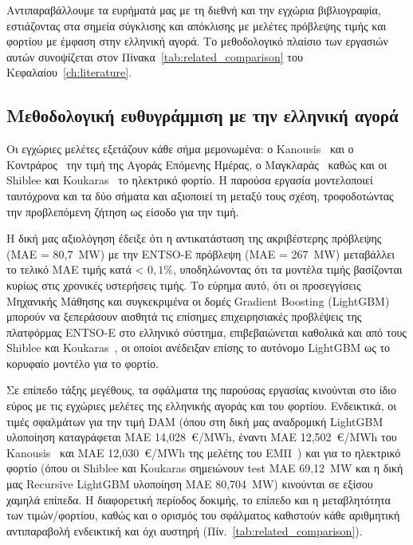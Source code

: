 Αντιπαραβάλλουμε τα ευρήματά μας με τη διεθνή και την εγχώρια βιβλιογραφία, εστιάζοντας
 στα σημεία σύγκλισης και απόκλισης με μελέτες πρόβλεψης τιμής
και φορτίου με έμφαση στην ελληνική αγορά. Tο μεθοδολογικό πλαίσιο των εργασιών αυτών συνοψίζεται
στον Πίνακα~\ref{tab:related_comparison} του Κεφαλαίου~\ref{ch:literature}.

\subsection{Μεθοδολογική ευθυγράμμιση με την ελληνική αγορά}
\label{subsec:greek_alignment}

Οι εγχώριες μελέτες εξετάζουν κάθε σήμα μεμονωμένα: ο Kanousis~\cite{kanousis2025}
και ο Κοντράρος~\cite{kontraros2023} την τιμή της Αγοράς Επόμενης Ημέρας, ο
Μαγκλαράς~\cite{magklaras2018} καθώς και οι Shiblee και Koukaras~\cite{shiblee2025shortterm} 
το ηλεκτρικό φορτίο. Η παρούσα εργασία μοντελοποιεί ταυτόχρονα και τα δύο σήματα 
και αξιοποιεί τη μεταξύ τους σχέση, τροφοδοτώντας την προβλεπόμενη ζήτηση ως είσοδο για την τιμή. 

Η δική μας αξιολόγηση έδειξε ότι η αντικατάσταση της ακριβέστερης πρόβλεψης (MAE = 80,7~MW) 
με την ENTSO‐E πρόβλεψη (MAE = 267~MW) μεταβάλλει το τελικό MAE τιμής κατά < $0,1\%$, 
υποδηλώνοντας ότι τα μοντέλα τιμής βασίζονται κυρίως στις χρονικές υστερήσεις τιμής. 
Το εύρημα αυτό, ότι οι προσεγγίσεις Μηχανικής Μάθησης και συγκεκριμένα οι δομές Gradient 
Boosting (LightGBM) μπορούν να ξεπεράσουν αισθητά τις επίσημες επιχειρησιακές προβλέψεις 
της πλατφόρμας ENTSO-E στο ελληνικό σύστημα, επιβεβαιώνεται καθολικά και από τους 
Shiblee και Koukaras~\cite{shiblee2025shortterm}, οι οποίοι ανέδειξαν επίσης το αυτόνομο 
LightGBM ως το κορυφαίο μοντέλο για το φορτίο.

Σε επίπεδο τάξης μεγέθους, τα σφάλματα της παρούσας εργασίας κινούνται στο ίδιο 
εύρος με τις εγχώριες μελέτες της ελληνικής αγοράς και του φορτίου. Ενδεικτικά, οι τιμές 
σφαλμάτων για την τιμή DAM (όπου στη δική μας αναδρομική LightGBM υλοποίηση καταγράφεται 
MAE 14,028~€/MWh, έναντι MAE 12,502~€/MWh του Kanousis~\cite{kanousis2025} και 
MAE 12,030~€/MWh της μελέτης του ΕΜΠ~\cite{ntua2025shortwindow}) και για το ηλεκτρικό 
φορτίο (όπου οι Shiblee και Koukaras σημειώνουν test MAE 69,12~MW και η δική μας 
Recursive LightGBM υλοποίηση MAE 80,704~MW) κινούνται σε εξίσου χαμηλά επίπεδα. 
Η διαφορετική περίοδος δοκιμής, το επίπεδο και η μεταβλητότητα των τιμών/φορτίου, 
καθώς και ο ορισμός του σφάλματος καθιστούν κάθε αριθμητική αντιπαραβολή ενδεικτική 
και όχι αυστηρή (Πίν.~\ref{tab:related_comparison}).

